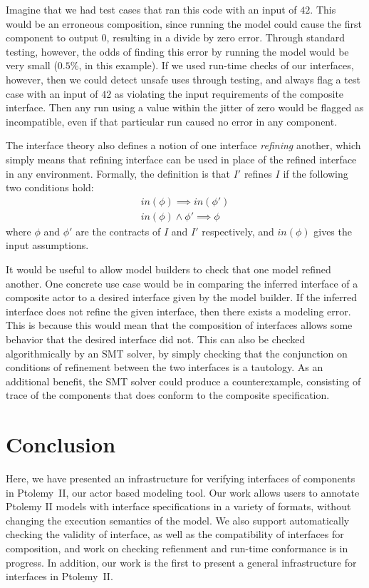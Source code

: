 \documentclass[preprint,11pt]{sigplanconf}
\begin{document}
Imagine that we had test cases that ran this code with an input of $42$.
This would be an erroneous composition, since running the model could cause
the first component to output $0$, resulting in a divide by zero error.
Through standard testing, however, the odds of finding this error by running
the model would be very small ($0.5\%$, in this example). If we used run-time
checks of our interfaces, however, then we could detect unsafe uses through
testing, and always flag a test case with an input of $42$ as violating the
input requirements of the composite interface. Then any run using a value
within the jitter of zero would be flagged as incompatible, even if that
particular run caused no error in any component.

The interface theory also defines a notion of one interface \emph{refining}
another, which simply means that refining interface can be used in place of the
refined interface in any environment.
Formally, the definition is that $I'$ refines $I$ if the following two
conditions hold:
\begin{align*}
in(\phi) \implies in(\phi') \\
in(\phi) \wedge \phi' \implies \phi
\end{align*}
where $\phi$ and $\phi'$ are the contracts of $I$ and $I'$ respectively, and
$in(\phi)$ gives the input assumptions.

It would be useful to allow model builders to check that one model
refined another.  One concrete use case would be in comparing the
inferred interface of a composite actor to a desired interface given by the
model builder.  If the inferred interface does not refine the given interface,
then there exists a modeling error.  This is because this would mean that the
composition of interfaces allows some behavior that the desired interface did
not.
%
This can also be checked algorithmically by an SMT solver, by simply checking
that the conjunction on conditions of refinement between the two interfaces is
a tautology.  As an additional benefit, the SMT solver could produce a
counterexample, consisting of trace of the components that does conform to the
composite specification.

\section{Conclusion}
Here, we have presented an infrastructure for verifying interfaces of
components in Ptolemy~II, our actor based modeling tool. Our work
allows users to annotate Ptolemy II models with interface specifications in a
variety of formats, without changing the execution semantics of the model.
We also support automatically checking the validity of interface, as well as the
compatibility of interfaces for composition, and work on checking refienment
and run-time conformance is in progress. In addition, our work is the first to
present a general infrastructure for interfaces in Ptolemy~II.
\end{document}
